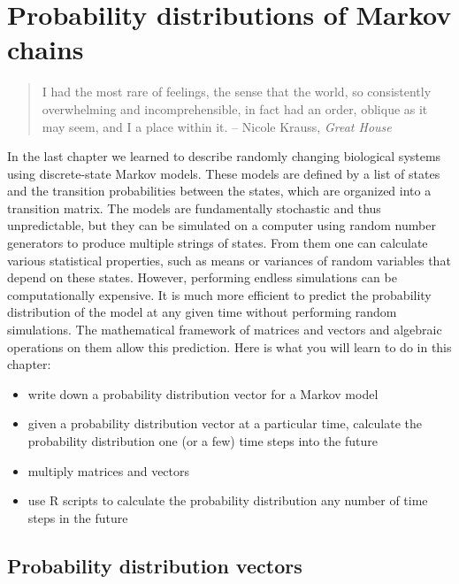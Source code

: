 \documentclass[
  letterpaper,
  DIV=11,
  numbers=noendperiod]{scrreprt}
\providecommand{\tightlist}{%
  \setlength{\itemsep}{0pt}\setlength{\parskip}{0pt}}\usepackage{longtable,booktabs,array}
\begin{document}

\hypertarget{probability-distributions-of-markov-chains}{%
\chapter{Probability distributions of Markov
chains}\label{probability-distributions-of-markov-chains}}

\begin{quote}
I had the most rare of feelings, the sense that the world, so
consistently overwhelming and incomprehensible, in fact had an order,
oblique as it may seem, and I a place within it. -- Nicole Krauss,
\emph{Great House}
\end{quote}

In the last chapter we learned to describe randomly changing biological
systems using discrete-state Markov models. These models are defined by
a list of states and the transition probabilities between the states,
which are organized into a transition matrix. The models are
fundamentally stochastic and thus unpredictable, but they can be
simulated on a computer using random number generators to produce
multiple strings of states. From them one can calculate various
statistical properties, such as means or variances of random variables
that depend on these states. However, performing endless simulations can
be computationally expensive. It is much more efficient to predict the
probability distribution of the model at any given time without
performing random simulations. The mathematical framework of matrices
and vectors and algebraic operations on them allow this prediction. Here
is what you will learn to do in this chapter:

\begin{itemize}
\tightlist
\item
  write down a probability distribution vector for a Markov model
\item
  given a probability distribution vector at a particular time,
  calculate the probability distribution one (or a few) time steps into
  the future
\item
  multiply matrices and vectors
\item
  use R scripts to calculate the probability distribution any number of
  time steps in the future
\end{itemize}

\hypertarget{probability-distribution-vectors}{%
\section{Probability distribution
vectors}\label{probability-distribution-vectors}}
\end{document}
